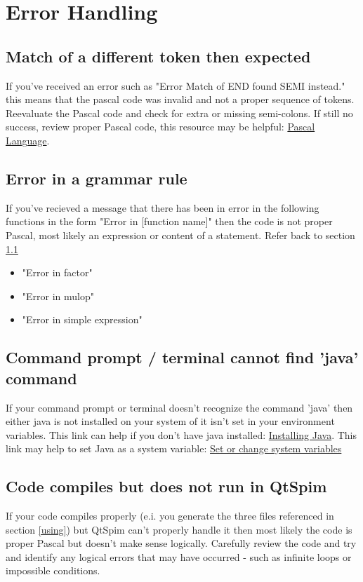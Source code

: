 \documentclass[english]{article}
\begin{document}
\section{Error Handling} \label{errors}

\subsection{Match of a different token then expected} \label{tokenerror}

If you've received an error such as "Error Match of END found SEMI instead." this means that the pascal code was invalid and not a proper sequence of tokens. Reevaluate the Pascal code and check for extra or missing semi-colons. If still no success, review proper Pascal code, this resource may be helpful:  \href{https://en.wikipedia.org/wiki/Pascal_(programming_language)}{Pascal Language}.

\subsection{Error in a grammar  rule}

If you've recieved a message that there has been in error in the following functions in the form "Error in [function name]" then the code is not proper Pascal, most likely an expression or content of a statement. Refer back to section \ref{tokenerror}
\begin{itemize}
   \item "Error in factor"
   \item "Error in mulop"
   \item "Error in simple expression"
\end{itemize}

\subsection{Command prompt / terminal cannot find 'java' command}

If your command prompt or terminal doesn't recognize the command 'java' then either java is not installed on your system of it isn't set in your environment variables. This link can help if you don't have java installed:   \href{https://www.java.com/en/download/help/download_options.xml}{Installing Java}. This link may help to set Java as a system variable:   \href{https://www.java.com/en/download/help/path.xmll}{Set or change system variables}


\subsection{Code compiles but does not run in QtSpim}

If your code compiles properly (e.i. you generate the three files referenced in section \ref{using}) but QtSpim can't properly handle it then most likely the code is proper Pascal but doesn't make sense logically. Carefully  review the code and try and identify any logical errors that may have occurred  - such as infinite  loops or impossible conditions.
\end{document}
